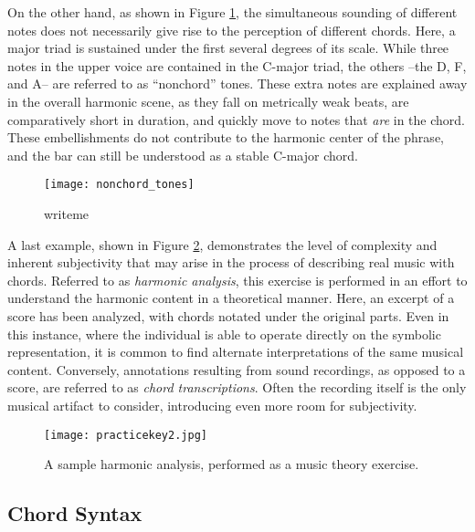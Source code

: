 On the other hand, as shown in Figure \ref{fig:nonchord_tones}, the simultaneous sounding of different notes does not necessarily give rise to the perception of different chords.
Here, a major triad is sustained under the first several degrees of its scale.
While three notes in the upper voice are contained in the C-major triad, the others --the D, F, and A-- are referred to as ``nonchord'' tones.
These extra notes are explained away in the overall harmonic scene, as they fall on metrically weak beats, are comparatively short in duration, and quickly move to notes that \emph{are} in the chord.
These embellishments do not contribute to the harmonic center of the phrase, and the bar can still be understood as a stable C-major chord.

\begin{figure}[t]
\centering
\texttt{[image: nonchord\_tones]}
\caption{writeme}
\label{fig:nonchord_tones}
\end{figure}

A last example, shown in Figure \ref{fig:mthomework}, demonstrates the level of complexity and inherent subjectivity that may arise in the process of describing real music with chords.
Referred to as \emph{harmonic analysis}, this exercise is performed in an effort to understand the harmonic content in a theoretical manner.
Here, an excerpt of a score has been analyzed, with chords notated under the original parts.
Even in this instance, where the individual is able to operate directly on the symbolic representation, it is common to find alternate interpretations of the same musical content.
Conversely, annotations resulting from sound recordings, as opposed to a score, are referred to as \emph{chord transcriptions}.
Often the recording itself is the only musical artifact to consider, introducing even more room for subjectivity.

\begin{figure}[t]
\centering
\texttt{[image: practicekey2.jpg]}
\caption{A sample harmonic analysis, performed as a music theory exercise.}
\label{fig:mthomework}
\end{figure}




\subsection{Chord Syntax}
\label{sec:chord_syntax}

